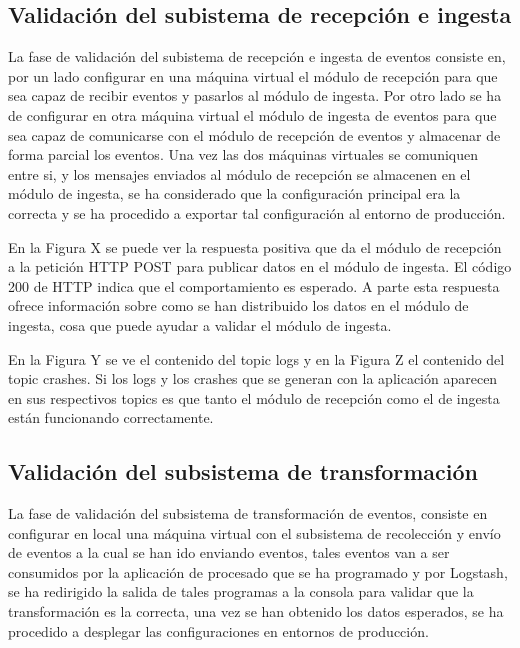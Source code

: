 \subsection{Validación del subistema de recepción e ingesta}
La fase de validación del subistema de recepción e ingesta de eventos consiste en, por un lado configurar en una máquina virtual el módulo de recepción para que sea capaz de recibir eventos y pasarlos al módulo de ingesta. Por otro lado se ha de configurar en otra máquina virtual el módulo de ingesta de eventos para que sea capaz de comunicarse con el módulo de recepción de eventos y almacenar de forma parcial los eventos. Una vez las dos máquinas virtuales se comuniquen entre si, y los mensajes enviados al módulo de recepción se almacenen en el módulo de ingesta, se ha considerado que la configuración principal era la correcta y se ha procedido a exportar tal configuración al entorno de producción.


En la Figura X se puede ver la respuesta positiva que da el módulo de recepción a la petición HTTP POST para publicar datos en el módulo de ingesta. El código 200 de HTTP indica que el comportamiento es esperado. A parte esta respuesta ofrece información sobre como se han distribuido los datos en el módulo de ingesta, cosa que puede ayudar a validar el módulo de ingesta. 

En la Figura Y se ve el contenido del topic logs y en la Figura Z el contenido del topic crashes. Si los logs y los crashes que se generan con la aplicación aparecen en sus respectivos topics es que tanto el módulo de recepción como el de ingesta están funcionando correctamente.

\subsection{Validación del subsistema de transformación}
La fase de validación del subsistema de transformación de eventos, consiste en configurar en local una máquina virtual con el subsistema de recolección y envío de eventos a la cual se han ido enviando eventos, tales eventos van a ser consumidos por la aplicación de procesado que se ha programado y por Logstash, se ha redirigido la salida de tales programas a la consola para validar que la transformación es la correcta, una vez se han obtenido los datos esperados, se ha procedido a desplegar las configuraciones en entornos de producción.

